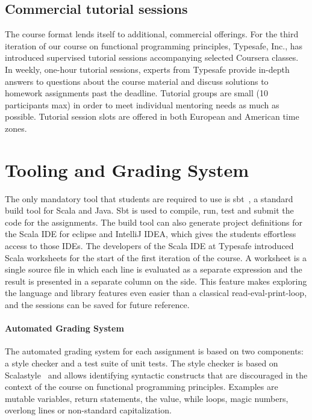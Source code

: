\documentclass{sig-alternate}
\begin{document}
\subsection{Commercial tutorial sessions}

The course format lends itself to additional, commercial offerings. For the
third iteration of our course on functional programming principles, Typesafe, Inc.,
has introduced supervised tutorial sessions accompanying selected Coursera
classes. In weekly, one-hour tutorial sessions, experts from Typesafe provide
in-depth answers to questions about the course material and discuss solutions
to homework assignments past the deadline. Tutorial groups are small (10
participants max) in order to meet individual mentoring needs as much as
possible. Tutorial session slots are offered in both European and American
time zones.

\section{Tooling and Grading System}
\label{sec:tooling-automated-grading}

The only mandatory tool that students are required to use is sbt~\cite{sbt}, a
standard build tool for Scala and Java. Sbt is used to compile, run, test and
submit the code for the assignments. The build tool can also generate project
definitions for the Scala IDE for eclipse and IntelliJ IDEA, which gives the
students effortless access to those IDEs. The developers of the Scala IDE at
Typesafe introduced Scala worksheets for the start of the first iteration
of the course. A worksheet is a single source file in which each line is
evaluated as a separate expression and the result is presented in a separate
column on the side. This feature makes exploring the language and library
features even easier than a classical read-eval-print-loop, and the sessions
can be saved for future reference.

\paragraph{Automated Grading System}

The automated grading system for each assignment is based on two components: a
style checker and a test suite of unit tests. The style checker is based on
Scalastyle~\cite{ScalaStyle} and allows identifying syntactic constructs that
are discouraged in the context of the course on functional programming principles.
Examples are mutable variables, return statements, the \lstinline@null@ value,
while loops, magic numbers, overlong lines or non-standard capitalization.
\end{document}
